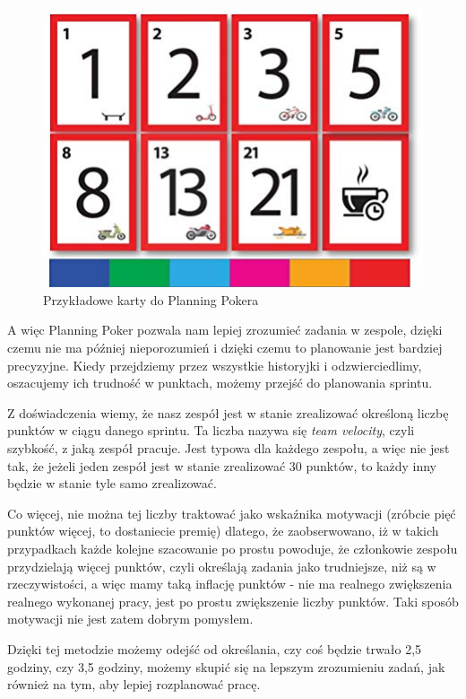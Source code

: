 \begin{figure}[H]
	\centering\includegraphics[width=.6\textwidth]{img/Planning_Poker}
	\caption{Przykładowe karty do Planning Pokera}\label{rysunek:poker}
\end{figure}

A więc Planning Poker pozwala nam lepiej zrozumieć zadania w zespole,
dzięki czemu nie ma później nieporozumień i dzięki czemu to planowanie jest bardziej precyzyjne.
Kiedy przejdziemy przez wszystkie historyjki i odzwierciedlimy, oszacujemy ich trudność w punktach,
możemy przejść do planowania sprintu.

Z doświadczenia wiemy, że nasz zespół jest w stanie zrealizować określoną liczbę punktów w ciągu danego sprintu.
Ta liczba nazywa się \textit{team velocity}, czyli szybkość, z jaką zespół pracuje.
Jest typowa dla każdego zespołu, a więc nie jest tak, że jeżeli jeden zespół
jest w stanie zrealizować 30 punktów, to każdy inny będzie w stanie tyle samo zrealizować.

Co więcej, nie można tej liczby traktować jako wskaźnika motywacji
(zróbcie pięć punktów więcej, to dostaniecie premię) dlatego,
że zaobserwowano, iż w takich przypadkach każde kolejne szacowanie po prostu powoduje,
że członkowie zespołu przydzielają więcej punktów, czyli określają zadania jako trudniejsze,
niż są w rzeczywistości, a więc mamy taką inflację punktów - nie ma realnego
zwiększenia realnego wykonanej pracy, jest po prostu zwiększenie liczby punktów.
Taki sposób motywacji nie jest zatem dobrym pomysłem.

Dzięki tej metodzie możemy odejść od określania, czy coś będzie trwało 2,5 godziny,
czy 3,5 godziny, możemy skupić się na lepszym zrozumieniu zadań,
jak również na tym, aby lepiej rozplanować pracę.

